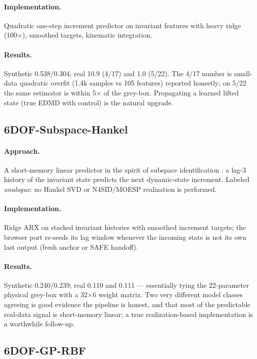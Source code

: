 \documentclass[11pt]{article}
\begin{document}
\paragraph{Implementation.} Quadratic one-step increment predictor on
invariant features with heavy ridge (100$\times$), smoothed targets,
kinematic integration.
\paragraph{Results.} Synthetic 0.538/0.304; real 10.9 (4/17) and 1.0
(5/22). The 4/17 number is small-data quadratic overfit (1.4k samples vs
105 features) reported honestly; on 5/22 the same estimator is within
5$\times$ of the grey-box. Propagating a learned lifted state (true EDMD
with control) is the natural upgrade.

\subsection{6DOF-Subspace-Hankel}
\paragraph{Approach.} A short-memory linear predictor in the spirit of
subspace identification \cite{VanOverscheeDeMoor1996,verhaegen1992subspace,
HOKALMAN+1966+545+548}: a lag-3 history of the invariant state predicts the
next dynamic-state increment. Labeled \emph{analogue}: no Hankel SVD or
N4SID/MOESP realization is performed.
\paragraph{Implementation.} Ridge ARX on stacked invariant histories with
smoothed increment targets; the browser port re-seeds its lag window
whenever the incoming state is not its own last output (fresh anchor or
SAFE handoff).
\paragraph{Results.} Synthetic 0.240/0.239; real 0.110 and 0.111 ---
essentially tying the 22-parameter physical grey-box with a 32$\times$6
weight matrix. Two very different model classes agreeing is good evidence
the pipeline is honest, and that most of the predictable real-data signal
is short-memory linear; a true realization-based implementation is a
worthwhile follow-up.

\subsection{6DOF-GP-RBF}
\end{document}
